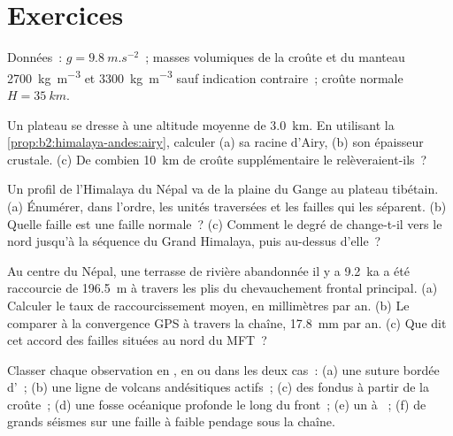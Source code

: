 \section*{Exercices}\label{sec:b2:himalaya-andes:exercises}

Données~: $g = \qty{9.8}{m.s^{-2}}$~; masses volumiques de la croûte et du manteau
\qty{2700}{kg.m^{-3}} et \qty{3300}{kg.m^{-3}} sauf indication contraire~; croûte normale $H =
\qty{35}{km}$.

\begin{exercise}[$\star$]\label{exo:b2:himalaya-andes:1}
Un plateau se dresse à une altitude moyenne de \qty{3.0}{km}. En utilisant la
\cref{prop:b2:himalaya-andes:airy}, calculer (a) sa racine d'Airy, (b) son épaisseur
crustale. (c) De combien \qty{10}{km} de croûte supplémentaire le relèveraient-ils~?
\end{exercise}

\begin{exercise}[$\star$]\label{exo:b2:himalaya-andes:2}
Un profil de l'Himalaya du Népal va de la plaine du Gange au plateau tibétain. (a)
Énumérer, dans l'ordre, les unités traversées et les failles qui les séparent. (b)
Quelle faille est une faille normale~? (c) Comment le degré de 
change-t-il vers le nord jusqu'à la séquence du Grand Himalaya, puis au-dessus d'elle~?
\end{exercise}

\begin{exercise}[$\star$]\label{exo:b2:himalaya-andes:3}
Au centre du Népal, une terrasse de rivière abandonnée il y a \qty{9.2}{ka} a été raccourcie
de \qty{196.5}{m} à travers les plis du chevauchement frontal principal. (a) Calculer le taux de
raccourcissement moyen, en millimètres par an. (b) Le comparer à la convergence GPS à travers
la chaîne, \qty{17.8}{mm} par an. (c) Que dit cet accord des failles situées au nord du MFT~?
\end{exercise}

\begin{exercise}[$\star$]\label{exo:b2:himalaya-andes:4}
Classer chaque observation en , en  ou dans les deux cas~:
(a) une suture bordée d'~; (b) une ligne de volcans andésitiques actifs~; (c) des 
fondus à partir de la croûte~; (d) une fosse océanique profonde le long du front~; (e) un
 à ~; (f) de grands séismes sur une faille à faible pendage sous la chaîne.
\end{exercise}

